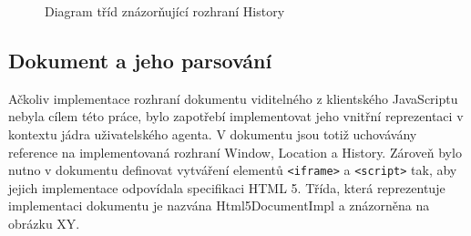 \begin{figure}[H]
  \begin{center}
    \caption{Diagram tříd znázorňující rozhraní History}
    \label{Figure.History}
  \end{center}
\end{figure}

\subsection{Dokument a jeho parsování}
\label{Chapter.Implementation.DocumentParsing}

Ačkoliv implementace rozhraní dokumentu viditelného z klientského JavaScriptu nebyla cílem této práce, bylo zapotřebí implementovat jeho vnitřní reprezentaci v kontextu jádra uživatelského agenta. V dokumentu jsou totiž uchovávány reference na implementovaná rozhraní Window, Location a History. Zároveň bylo nutno v dokumentu definovat vytváření elementů \texttt{<iframe>} a \texttt{<script>} tak, aby jejich implementace odpovídala specifikaci HTML 5. Třída, která reprezentuje implementaci dokumentu je nazvána Html5DocumentImpl a znázorněna na obrázku XY. 

